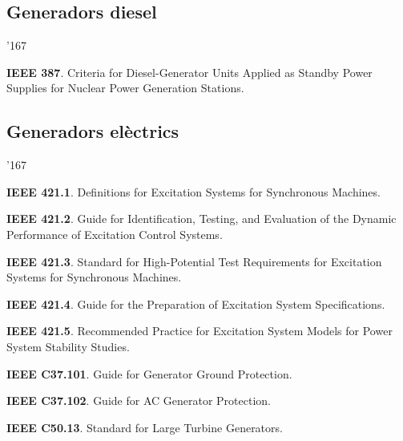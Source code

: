 \subsection*{Generadors diesel}
\begin{dinglist}{'167}
    \item \textbf{IEEE 387}. Criteria for Diesel-Generator Units Applied as Standby Power Supplies for Nuclear Power Generation Stations.
\end{dinglist}


\subsection*{Generadors el\`{e}ctrics}
\begin{dinglist}{'167}
    \item \textbf{IEEE 421.1}. Definitions for Excitation Systems for Synchronous Machines.
    \item \textbf{IEEE 421.2}. Guide for Identification, Testing, and Evaluation of the Dynamic Performance of Excitation Control Systems.
    \item \textbf{IEEE 421.3}. Standard for High-Potential Test Requirements for Excitation Systems for Synchronous Machines.
    \item \textbf{IEEE 421.4}. Guide for the Preparation of Excitation System Specifications.
    \item \textbf{IEEE 421.5}. Recommended Practice for Excitation System Models for Power System Stability Studies.
    \item \textbf{IEEE C37.101}. Guide for Generator Ground Protection.
    \item \textbf{IEEE C37.102}. Guide for AC Generator Protection.
    \item \textbf{IEEE C50.13}. Standard for Large Turbine Generators.
\end{dinglist}



